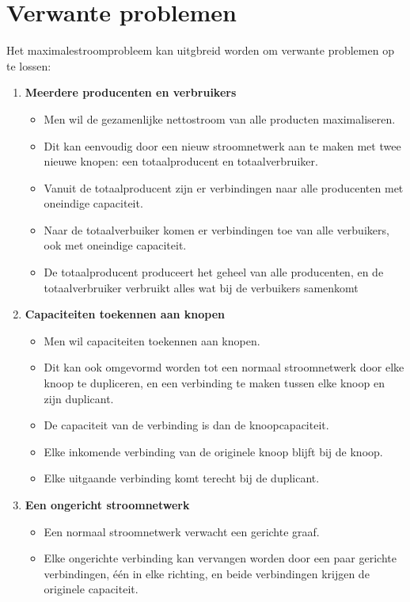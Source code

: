\section{Verwante problemen}
Het maximalestroomprobleem kan uitgbreid worden om verwante problemen op te lossen:
\begin{enumerate}
    \item \textbf{Meerdere producenten en verbruikers}
    \begin{itemize}
        \item Men wil de gezamenlijke nettostroom van alle producten maximaliseren.
        \item Dit kan eenvoudig door een nieuw stroomnetwerk aan te maken met twee nieuwe knopen: een totaalproducent en totaalverbruiker.
        \item Vanuit de totaalproducent zijn er verbindingen naar alle producenten met oneindige capaciteit.
        \item Naar de totaalverbuiker komen er verbindingen toe van alle verbuikers, ook met oneindige capaciteit.
        \item De totaalproducent produceert het geheel van alle producenten, en de totaalverbruiker verbruikt alles wat bij de verbuikers samenkomt
    \end{itemize}
    \item \textbf{Capaciteiten toekennen aan knopen}
    \begin{itemize}
        \item Men wil capaciteiten toekennen aan knopen.
        \item Dit kan ook omgevormd worden tot een normaal stroomnetwerk door elke knoop te dupliceren, en een verbinding te maken tussen elke knoop en zijn duplicant.
        \item De capaciteit van de verbinding is dan de knoopcapaciteit.
        \item Elke inkomende verbinding van de originele knoop blijft bij de knoop.
        \item Elke uitgaande verbinding komt terecht bij de duplicant.
    \end{itemize}
    \item \textbf{Een ongericht stroomnetwerk}
    \begin{itemize}
        \item Een normaal stroomnetwerk verwacht een gerichte graaf.
        \item Elke ongerichte verbinding kan vervangen worden door een paar gerichte verbindingen, één in elke richting, en beide verbindingen krijgen de originele capaciteit.

\end{itemize}
\end{enumerate}
